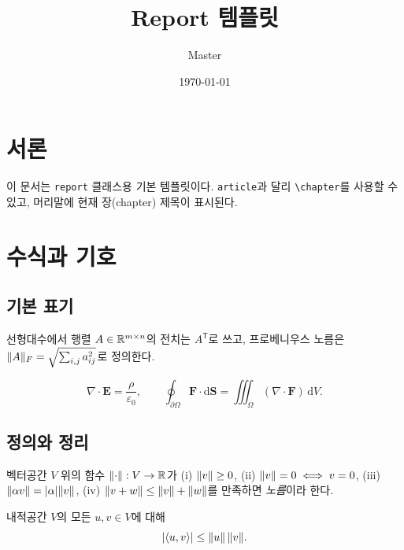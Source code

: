 \documentclass[a4paper,11pt]{report}
\title{Report 템플릿}
\author{Master}
\date{\today}
\begin{document}
\maketitle
\tableofcontents

\chapter{서론}

이 문서는 \texttt{report} 클래스용 기본 템플릿이다. \texttt{article}과 달리
\verb|\chapter|를 사용할 수 있고, 머리말에 현재 장(chapter) 제목이 표시된다.

\chapter{수식과 기호}

\section{기본 표기}
선형대수에서 행렬 $A \in \mathbb{R}^{m\times n}$의 전치는 $A^{\mathsf T}$로 쓰고,
프로베니우스 노름은 $\lVert A\rVert_F = \sqrt{\sum_{i,j} a_{ij}^2}$로 정의한다.

\begin{equation}
  \nabla \cdot \mathbf{E} = \frac{\rho}{\varepsilon_0},
  \qquad
  \oint_{\partial \Omega} \mathbf{F}\cdot \mathrm{d}\mathbf{S}
    = \iiint_\Omega (\nabla\cdot\mathbf{F})\,\mathrm{d}V.
\end{equation}

\section{정의와 정리}

\begin{definition}[노름 공간]
  벡터공간 $V$ 위의 함수 $\lVert\cdot\rVert : V \to \mathbb{R}$가 (i) $\lVert v\rVert\ge 0$,
  (ii) $\lVert v\rVert=0 \iff v=0$, (iii) $\lVert\alpha v\rVert=\lvert\alpha\rvert\lVert v\rVert$,
  (iv) $\lVert v+w\rVert\le \lVert v\rVert+\lVert w\rVert$를 만족하면 \emph{노름}이라 한다.
\end{definition}

\begin{theorem}
  내적공간 $V$의 모든 $u, v \in V$에 대해
  \[
    \lvert\langle u, v\rangle\rvert \le \lVert u\rVert\,\lVert v\rVert.
  \]
\end{theorem}
\end{document}
